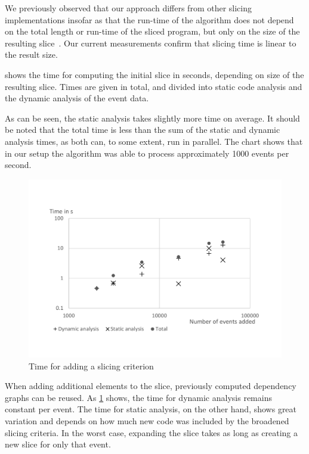 We previously observed that our approach differs from other slicing implementations insofar as that the run-time of the algorithm does not depend on the total length or run-time of the sliced program, but only on the size of the resulting slice~\cite{treffer_dynamic_2014}.
Our current measurements confirm that slicing time is linear to the result size.

 shows the time for computing the initial slice in seconds, depending on size of the resulting slice.
Times are given in total, and divided into static code analysis and the dynamic analysis of the event data.

As can be seen, the static analysis takes slightly more time on average.
It should be noted that the total time is less than the sum of the static and dynamic analysis times, as both can, to some extent, run in parallel.
The chart shows that in our setup the algorithm was able to process approximately 1000 events per second.

\begin{figure}
	\centering
		\includegraphics[width=\linewidth, clip, trim={20mm 26mm 20mm 26mm}]{img/chart-add.pdf}
	\caption{Time for adding a slicing criterion}
	\label{fig:chartadd}
\end{figure}

When adding additional elements to the slice, previously computed dependency graphs can be reused.
As \cref{fig:chartadd} shows, the time for dynamic analysis remains constant per event.
The time for static analysis, on the other hand, shows great variation and depends on how much new code was included by the broadened slicing criteria.
In the worst case, expanding the slice takes as long as creating a new slice for only that event.

